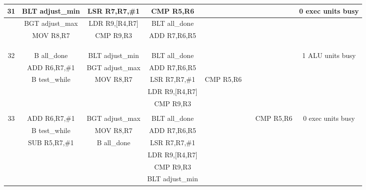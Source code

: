 \documentclass{article}
\begin{document}
{\begin{landscape}
\begin{longtable}{|c|c|c|c|c:c|c|c|}
    31 & BLT adjust\_min & LSR R7,R7,\#1 & CMP R5,R6 & & & & 0 exec units busy \\ \hline
     & BGT adjust\_max & LDR R9,[R4,R7] & BLT all\_done & & & & \\ \hline
     & MOV R8,R7 & CMP R9,R3 & ADD R7,R6,R5 & &  & & \\ \hline
     &  &  & & &  & & \\ \hline
     &  &  & &  &  &  & \\ \hline
     &  &  & &  &  &  & \\ \hline \hline
    
    32 & B all\_done & BLT adjust\_min & BLT all\_done & & & & 1 ALU units busy \\ \hline
     & ADD R6,R7,\#1 & BGT adjust\_max & ADD R7,R6,R5 & & & & \\ \hline
     & B test\_while & MOV R8,R7 & LSR R7,R7,\#1 & CMP R5,R6 &  & & \\ \hline
     &  &  & LDR R9,[R4,R7] & &  & & \\ \hline
     &  &  & CMP R9,R3 &  &  &  & \\ \hline
     &  &  & &  &  &  & \\ \hline \hline
     
    33 & ADD R6,R7,\#1 & BGT adjust\_max & BLT all\_done & & & CMP R5,R6 & 0 exec units busy \\ \hline
     & B test\_while & MOV R8,R7 & ADD R7,R6,R5 & & & & \\ \hline
     & SUB R5,R7,\#1 & B all\_done & LSR R7,R7,\#1 & &  & & \\ \hline
     &  &  & LDR R9,[R4,R7] & &  & & \\ \hline
     &  &  & CMP R9,R3 &  &  &  & \\ \hline
     &  &  & BLT adjust\_min &  &  &  & \\ \hline \hline
     

\end{longtable}
\end{landscape}}
\end{document}
